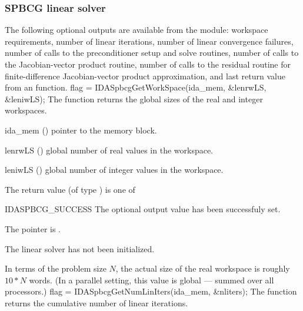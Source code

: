 {\subsubsection{SPBCG linear solver}\label{sss:optout_spbcg}
The following optional outputs are available from the {\idaspbcg} module:
workspace requirements, number of linear iterations,
number of linear convergence failures, number of calls to the preconditioner
setup and solve routines, number of calls to the Jacobian-vector product routine,
 number of calls to the residual routine for finite-difference  Jacobian-vector
 product approximation, and last return value from an {\idaspbcg} function.
{
  flag = IDASpbcgGetWorkSpace(ida\_mem, \&lenrwLS, \&leniwLS);
}
{
  The function  returns the global sizes of
  the {\idaspbcg} real and integer workspaces.
}
{
  \begin{args}[lenrwLS]
  \item[ida\_mem] ()
    pointer to the {\ida} memory block.
  \item[lenrwLS] ()
    global number of real values in the {\idaspbcg} workspace.
  \item[leniwLS] ()
    global number of integer values in the {\idaspbcg} workspace.
  \end{args}
}
{
  The return value  (of type ) is one of
  \begin{args}
  \item[IDASPBCG\_SUCCESS] 
    The optional output value has been successfuly set.
  \item[\Id{IDASPBCG\_MEM\_NULL}]
    The  pointer is .
  \item[\Id{IDASPBCG\_LMEM\_NULL}]
    The {\idaspbcg} linear solver has not been initialized.
  \end{args}
}
{
  In terms of the problem size $N$, the actual size of the real workspace is
  roughly $10*N$  words.  (In a parallel setting, this value
  is global --- summed over all processors.)
}
{
  flag = IDASpbcgGetNumLinIters(ida\_mem, \&nliters);
}
{
  The function  returns the
  cumulative number of linear iterations.
}}
